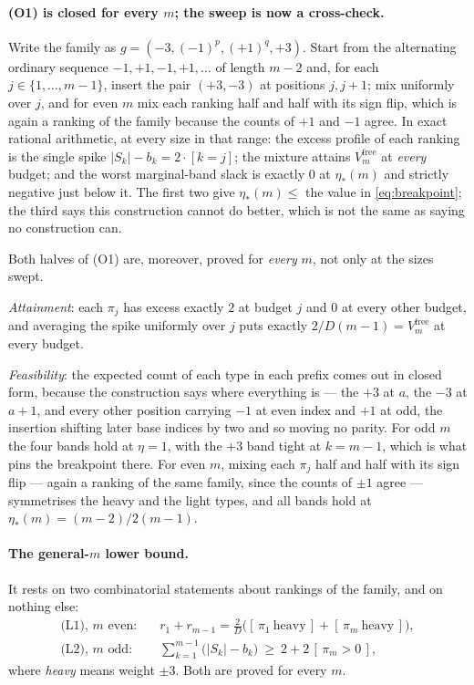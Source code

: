 \paragraph{(O1) is closed for every $m$; the sweep is now a cross-check.}
Write the family as $g=(-3,(-1)^{p},(+1)^{q},+3)$. Start from the alternating ordinary
sequence $-1,+1,-1,+1,\dots$ of length $m-2$ and, for each $j\in\{1,\dots,m-1\}$, insert the
pair $(+3,-3)$ at positions $j,j+1$; mix uniformly over $j$, and for even $m$ mix each
ranking half and half with its sign flip, which is again a ranking of the family because the
counts of $+1$ and $-1$ agree. In exact rational arithmetic, at every size in that range:
the excess profile of each ranking is the single spike $|S_{k}|-b_{k}=2\cdot[k=j]$; the
mixture attains $V^{\mathrm{free}}_{m}$ at \emph{every} budget; and the worst
marginal-band slack is exactly $0$ at $\eta_{*}(m)$ and strictly negative just below it. The
first two give $\eta_{*}(m)\le$ the value in \eqref{eq:breakpoint}; the third says this
construction cannot do better, which is not the same as saying no construction can. \CERT{}

Both halves of (O1) are, moreover, proved for \emph{every} $m$, not only at the sizes swept.

\emph{Attainment}: each $\pi_{j}$ has excess exactly $2$ at budget $j$ and $0$ at every
other budget, and averaging the spike uniformly over $j$ puts exactly
$2/D(m-1)=V^{\mathrm{free}}_{m}$ at every budget.

\emph{Feasibility}: the expected count of each type in each prefix comes out in closed form,
because the construction says where everything is --- the $+3$ at $a$, the $-3$ at $a+1$,
and every other position carrying $-1$ at even index and $+1$ at odd, the insertion shifting
later base indices by two and so moving no parity. For odd $m$ the four bands hold at
$\eta=1$, with the $+3$ band tight at $k=m-1$, which is what pins the breakpoint there. For
even $m$, mixing each $\pi_{j}$ half and half with its sign flip --- again a ranking of the
same family, since the counts of $\pm1$ agree --- symmetrises the heavy and the light types,
and all bands hold at $\eta_{*}(m)=(m-2)/2(m-1)$.


\paragraph{The general-$m$ lower bound.}
It rests on two combinatorial statements about rankings of the family, and on nothing else:
\begin{align}
\text{(L1), $m$ even:}\quad & r_{1}+r_{m-1}=\tfrac{2}{D}\bigl([\,\pi_{1}\ \text{heavy}\,]
  +[\,\pi_{m}\ \text{heavy}\,]\bigr),\label{eq:L1}\\
\text{(L2), $m$ odd:}\quad & \textstyle\sum_{k=1}^{m-1}\bigl(|S_{k}|-b_{k}\bigr)\ \ge\
  2+2\,[\,\pi_{m}>0\,],\label{eq:L2}
\end{align}
where \emph{heavy} means weight $\pm3$. Both are proved for every $m$.

